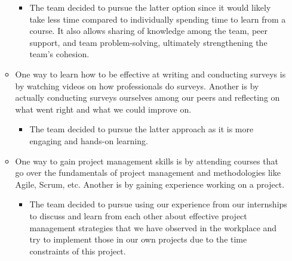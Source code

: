 \documentclass[12pt, titlepage]{article}
\begin{document}
\begin{enumerate}
\begin{itemize}
        \begin{itemize}
            \item The team decided to pursue the latter option since it would likely take less time compared to individually spending time to learn from a course. It also allows sharing of knowledge among the team, peer support, and team problem-solving, ultimately strengthening the team’s cohesion.
        \end{itemize}
        \item One way to learn how to be effective at writing and conducting surveys is by watching videos on how professionals do surveys. Another is by actually conducting surveys ourselves among our peers and reflecting on what went right and what we could improve on.
        \begin{itemize}
            \item The team decided to pursue the latter approach as it is more engaging and hands-on learning.
        \end{itemize}
        \item One way to gain project management skills is by attending courses that go over the fundamentals of project management and methodologies like Agile, Scrum, etc. Another is by gaining experience working on a project.
        \begin{itemize}
            \item The team decided to pursue using our experience from our internships to discuss and learn from each other about effective project management strategies that we have observed in the workplace and try to implement those in our own projects due to the time constraints of this project.
        \end{itemize}
    \end{itemize}
\end{enumerate} 
\end{document}
